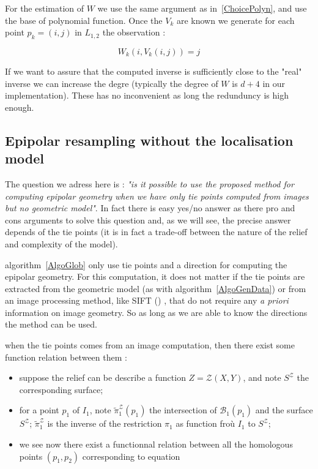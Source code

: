 \documentclass{ipol}
\newcommand{\Bund}[1]{\ensuremath{\mathcal{B}_{#1}}}
\newcommand{\BundO}{\Bund{1}}
\newcommand{\PiZVert}{\widetilde{\pi}_1^{\mathcal{Z}} }
\begin{document}
For the estimation of $W$ we use the same argument as in~\ref{ChoicePolyn}, and
use the base of polynomial function. Once the $V_k$ are known we generate
for each point $p_k=(i,j)$ in $L_{1,2}$ the observation :

\begin{equation}
   W_k(i,V_k(i,j))  = j \label{InverseEpip}
\end{equation}

If we want to assure that the computed inverse is sufficiently close
to the "real" inverse we can increase the degre (typically the degree of $W$
is $d+4$ in our implementation). These has no inconvenient as long the redunduncy
is high enough.


\subsection{Epipolar resampling without the localisation model}

\label{EpipTieP}

The question we adress here is : \emph{"is it possible to use
the proposed method  for computing epipolar geometry
when we have only  tie points computed from images but no geometric model"}.  In fact
there is easy yes/no answer as there pro and cons arguments to solve this question 
and, as we will see, the precise answer depends of the tie points (it is in fact a
trade-off between the nature of the relief and complexity of the model).

  algorithm~\ref{AlgoGlob} only use tie points and a
direction for computing the epipolar geometry. For this computation,
it does not matter if the tie points are extracted from the geometric model
(as with algorithm~\ref{AlgoGenData}) or from an image 
processing method, like SIFT (\cite{LOWE}) , that do not require any
\emph{a priori} information on image geometry. So as long as we
are able to know the directions the method can be used.


 when the tie points comes from an image computation,
then there exist some function relation between them :

\begin{itemize}
   \item suppose the relief can be describe a function $Z=\mathcal{Z}(X,Y)$,
         and note $S^\mathcal{Z}$  the corresponding surface;
   \item for a point $p_1$ of $I_1$, note $ \PiZVert (p_1)$
         the intersection of  $\BundO(p_1)$ and the surface  $S^\mathcal{Z}$;
         $\PiZVert$ is the inverse of the restriction  $\pi_1$ 
         as function froù $I_1$ to $S^\mathcal{Z}$;

   \item we see now there exist a functionnal relation between all the homologous
         points $(p_1,p_2)$ corresponding to equation 
\end{itemize}
\end{document}
